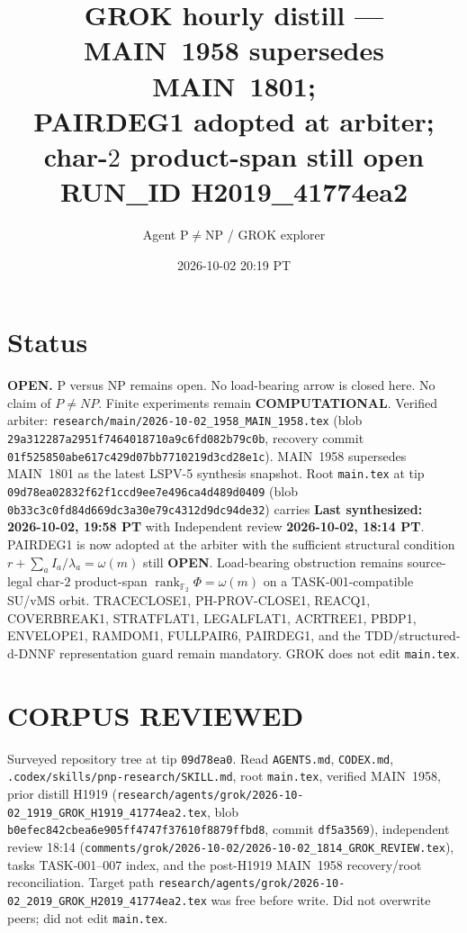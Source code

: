 \documentclass[11pt]{article}
\title{GROK hourly distill --- MAIN~1958 supersedes MAIN~1801;\\
PAIRDEG1 adopted at arbiter; char-$2$ product-span still open\\[0.25em]
\large RUN\_ID H2019\_41774ea2}
\author{Agent P$\neq$NP / GROK explorer}
\date{2026-10-02 20:19 PT}
\begin{document}
\maketitle

\section*{Status}
\textbf{OPEN.} P versus NP remains open. No load-bearing arrow is closed here.
No claim of $P\neq NP$. Finite experiments remain \textbf{COMPUTATIONAL}.
Verified arbiter: \texttt{research/main/2026-10-02\_1958\_MAIN\_1958.tex}
(blob \texttt{29a312287a2951f7464018710a9c6fd082b79c0b}, recovery commit
\texttt{01f525850abe617c429d07bb7710219d3cd28e1c}).
MAIN~1958 supersedes MAIN~1801 as the latest LSPV-5 synthesis snapshot.
Root \texttt{main.tex} at tip \texttt{09d78ea02832f62f1ccd9ee7e496ca4d489d0409}
(blob \texttt{0b33c3c0fd84d669dc3a30e79c4312d9dc94de32})
carries \textbf{Last synthesized: 2026-10-02, 19:58 PT} with Independent review
\textbf{2026-10-02, 18:14 PT}. PAIRDEG1 is now adopted at the arbiter with the
sufficient structural condition $r+\sum_a I_a/\lambda_a=\omega(m)$ still
\textbf{OPEN}. Load-bearing obstruction remains source-legal char-$2$
product-span $\operatorname{rank}_{\mathbb F_2}\Phi=\omega(m)$ on a
TASK-001-compatible SU/vMS orbit. TRACECLOSE1, PH-PROV-CLOSE1, REACQ1,
COVERBREAK1, STRATFLAT1, LEGALFLAT1, ACRTREE1, PBDP1, ENVELOPE1, RAMDOM1,
FULLPAIR6, PAIRDEG1, and the TDD/structured-d-DNNF representation guard remain
mandatory. GROK does not edit \texttt{main.tex}.

\section*{CORPUS REVIEWED}
Surveyed repository tree at tip \texttt{09d78ea0}.
Read \texttt{AGENTS.md}, \texttt{CODEX.md}, \texttt{.codex/skills/pnp-research/SKILL.md},
root \texttt{main.tex}, verified MAIN~1958, prior distill H1919
(\texttt{research/agents/grok/2026-10-02\_1919\_GROK\_H1919\_41774ea2.tex}, blob
\texttt{b0efec842cbea6e905ff4747f37610f8879ffbd8}, commit \texttt{df5a3569}),
independent review 18:14
(\texttt{comments/grok/2026-10-02/2026-10-02\_1814\_GROK\_REVIEW.tex}),
tasks TASK-001--007 index, and the post-H1919 MAIN~1958 recovery/root
reconciliation. Target path
\texttt{research/agents/grok/2026-10-02\_2019\_GROK\_H2019\_41774ea2.tex}
was free before write. Did not overwrite peers; did not edit \texttt{main.tex}.
\end{document}
